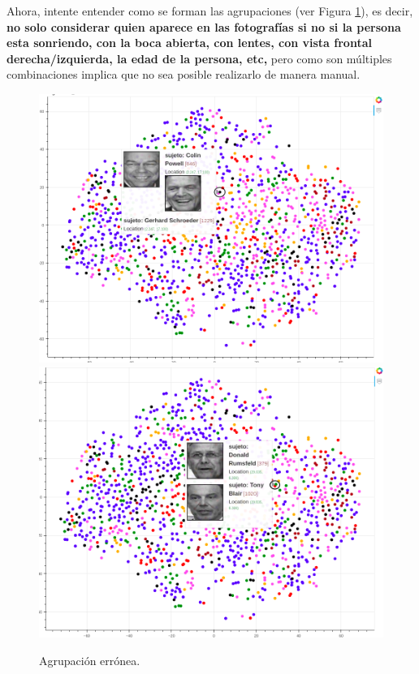 \documentclass[paper=letter, fontsize=11pt]{scrartcl}
\numberwithin{equation}{section} %
\numberwithin{figure}{section} %
\numberwithin{table}{section} %
\begin{document}
Ahora, intente entender como se forman las agrupaciones (ver Figura \ref{diff}), es decir, \textbf{no solo considerar quien aparece en las fotografías si no si la persona esta sonriendo, con la boca abierta, con lentes, con vista frontal derecha/izquierda, la edad de la persona, etc,} pero como son múltiples combinaciones implica que no sea posible realizarlo de manera manual.
\begin{figure}[H]
  \includegraphics[width=\linewidth]{figure/diff_example.png}
\endminipage\hfill
{}
  \includegraphics[width=\linewidth]{figure/diff_example2.png}
\endminipage
\caption{Agrupación errónea.}
\label{diff}
\end{figure}
\end{document}
